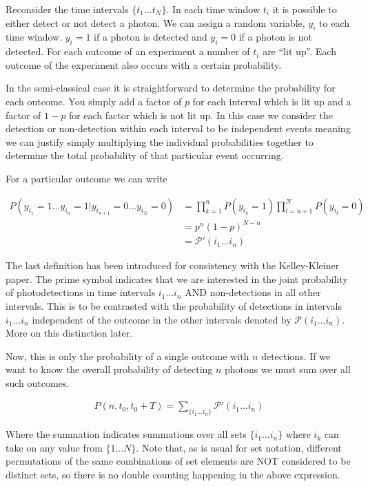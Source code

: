 \documentclass[12pt]{article}
\begin{document}
Reconsider the time intervals $\{t_1 \ldots t_N\}$. In each time window $t_i$ it is possible to either detect or not detect a photon. We can assign a random variable, $y_i$ to each time window. $y_i=1$ if a photon is detected and $y_i=0$ if a photon is not detected. For each outcome of an experiment a number of $t_i$ are ``lit up''. Each outcome of the experiment also occurs with a certain probability. 

In the semi-classical case it is straightforward to determine the probability for each outcome. You simply add a factor of $p$ for each interval which is lit up and a factor of $1-p$ for each factor which is not lit up. In this case we consider the detection or non-detection within each interval to be independent events meaning we can justify simply multiplying the individual probabilities together to determine the total probability of that particular event occurring.

For a particular outcome we can write

\begin{align}
\label{factorize}
P(y_{i_1}=1 \ldots y_{i_n}=1 | y_{i_{n+1}}=0 \ldots y_{i_N}=0) &= \prod_{k=1}^n P(y_{i_k}=1) \prod_{l=n+1}^N P(y_{i_l}=0)\\
&= p^n (1-p)^{N-n}\\
&= \mathcal{P}'(i_1 \ldots i_n)
\end{align}

The last definition has been introduced for consistency with the Kelley-Kleiner paper. The prime symbol indicates that we are interested in the joint probability of photodetections in time intervals $i_1 \ldots i_n$ AND non-detections in all other intervals. This is to be contrasted with the probability of detections in intervals $i_1 \ldots i_n$ independent of the outcome in the other intervals denoted by $\mathcal{P}(i_1 \ldots i_n)$. More on this distinction later.

Now, this is only the probability of a single outcome with $n$ detections. If we want to know the overall probability of detecting $n$ photons we must sum over all such outcomes.

\begin{align}
\label{nphoton}
P(n,t_0,t_0+T) = \sum_{\{i_1 \ldots i_n\}} \mathcal{P}'(i_1 \ldots i_n)
\end{align}

Where the summation indicates summations over all sets $\{i_1 \ldots i_n\}$ where $i_k$ can take on any value from $\{1 \ldots N\}$. Note that, as is usual for set notation, different permutations of the same combinations of set elements are NOT considered to be distinct sets, so there is no double counting happening in the above expression.
\end{document}
